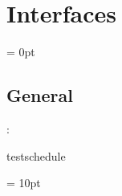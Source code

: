 
\section{Interfaces} 


\parskip = 0pt

\vspace{3mm} \subsection*{General}

: 

testschedule
\vspace{2mm}

\vspace{5mm}\parskip = 10pt 
